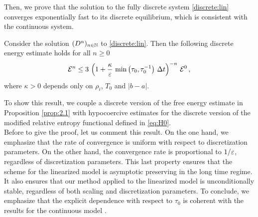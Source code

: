 \documentclass[11pt]{amsart}
\numberwithin{equation}{section}
\numberwithin{figure}{section}
\begin{document}
Then, we prove that the solution to the fully discrete system
\eqref{discrete:lin} converges exponentially fast to its discrete equilibrium, which is consistent with the continuous system.
\begin{theorem}
        \label{th:3.1}
      Consider the solution $(D^n)_{n\in{\mathbb N}}$ to \eqref{discrete:lin}. Then the following discrete energy estimate holds for all $n\geq0$
$$
  {\mathcal E}^{n} \leq 3\,
  \left(1+\frac{\kappa}{\varepsilon}\,\min\left(\tau_0,\tau_0^{-1}\right)\,\Delta
    t\right)^{-n} \,
    {\mathcal E}^{0}\,,
$$
where $\kappa>0$ depends only on $\rho_i$, $T_0$ and $|b-a|$.
\end{theorem}
To show this result, we couple a discrete version of the free energy
estimate in Proposition \ref{prop:2.1} with hypocoercive
estimates for the discrete version of the modified relative entropy functional defined in \eqref{eq:H0}.\\

Before to give the proof, let us comment  this  result. On the one hand, we emphasize
that the rate of convergence is uniform with respect to discretization
parameters.
On the other hand, the convergence rate is proportional to $1/\varepsilon$,
regardless of discretization parameters. This last property ensures that the scheme for the linearized model is asymptotic preserving in the long time regime. It also ensures that our method applied to the linearized model is unconditionally stable, regardless of both scaling and discretization parameters. To conclude, we emphasize that the explicit dependence with respect to $\tau_0$ is coherent with the results for the continuous model \cite{Herda_Rodrigues}.
\end{document}
